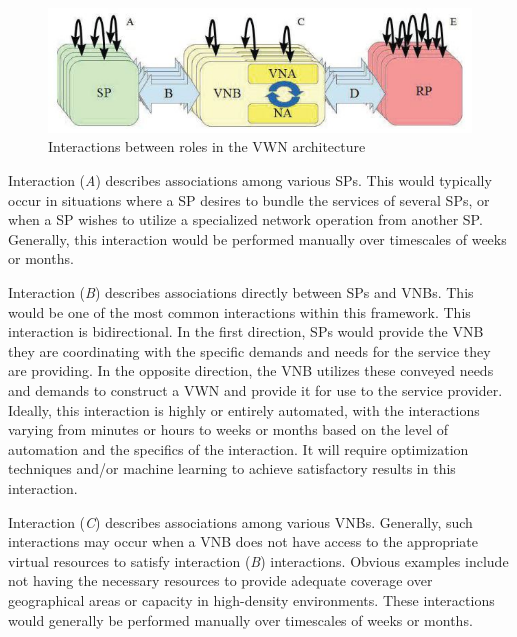 \documentclass[12pt,dvipsnames]{report}
\begin{document}
\begin{figure}
	\centering
	\includegraphics[width=\linewidth]{VWNArchitectureInteractions}
	\caption[Interactions between roles in the VWN architecture]{\small Interactions between roles in the VWN architecture~\cite{MJ_MECOMM_17}}
	\label{fig:VWNArchitectureInteractions}
\end{figure}

Interaction (\emph{A}) describes associations among various SPs.  This would typically occur in situations where a SP desires to bundle the services of several SPs, or when a SP wishes to utilize a specialized network operation from another SP.  Generally, this interaction would be performed manually over timescales of weeks or months.

Interaction (\emph{B}) describes associations directly between SPs and VNBs.  This would be one of the most common interactions within this framework.  This interaction is bidirectional.  In  the first direction, SPs would provide the VNB they are coordinating with the specific demands and needs for the service they are providing.  In the opposite direction, the VNB utilizes these conveyed needs and demands to construct a VWN and provide it for use to the service provider.  Ideally, this interaction is highly or entirely automated, with the interactions varying from minutes or hours to weeks or months based on the level of automation and the specifics of the interaction.  It will require optimization techniques and/or machine learning to achieve satisfactory results in this interaction.

Interaction (\emph{C}) describes associations among various VNBs.  Generally, such interactions may occur when a VNB does not have access to the appropriate virtual resources to satisfy interaction (\emph{B}) interactions.  Obvious examples include not having the necessary resources to provide adequate coverage over geographical areas or capacity in high-density environments.  These interactions would generally be performed manually over timescales of weeks or months.
\end{document}
